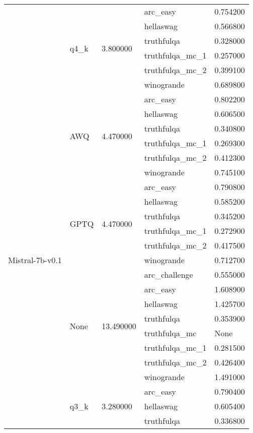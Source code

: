 \begin{tabular}{lllll}
 & \multirow[t]{6}{*}{q4\_k} & \multirow[t]{6}{*}{3.800000} & arc\_easy & 0.754200 \\
 &  &  & hellaswag & 0.566800 \\
 &  &  & truthfulqa & 0.328000 \\
 &  &  & truthfulqa\_mc\_1 & 0.257000 \\
 &  &  & truthfulqa\_mc\_2 & 0.399100 \\
 &  &  & winogrande & 0.689800 \\
\cline{1-5} \cline{2-5} \cline{3-5}
\multirow[t]{38}{*}{Mistral-7b-v0.1} & \multirow[t]{6}{*}{AWQ} & \multirow[t]{6}{*}{4.470000} & arc\_easy & 0.802200 \\
 &  &  & hellaswag & 0.606500 \\
 &  &  & truthfulqa & 0.340800 \\
 &  &  & truthfulqa\_mc\_1 & 0.269300 \\
 &  &  & truthfulqa\_mc\_2 & 0.412300 \\
 &  &  & winogrande & 0.745100 \\
\cline{2-5} \cline{3-5}
 & \multirow[t]{6}{*}{GPTQ} & \multirow[t]{6}{*}{4.470000} & arc\_easy & 0.790800 \\
 &  &  & hellaswag & 0.585200 \\
 &  &  & truthfulqa & 0.345200 \\
 &  &  & truthfulqa\_mc\_1 & 0.272900 \\
 &  &  & truthfulqa\_mc\_2 & 0.417500 \\
 &  &  & winogrande & 0.712700 \\
\cline{2-5} \cline{3-5}
 & \multirow[t]{8}{*}{None} & \multirow[t]{8}{*}{13.490000} & arc\_challenge & 0.555000 \\
 &  &  & arc\_easy & 1.608900 \\
 &  &  & hellaswag & 1.425700 \\
 &  &  & truthfulqa & 0.353900 \\
 &  &  & truthfulqa\_mc & None \\
 &  &  & truthfulqa\_mc\_1 & 0.281500 \\
 &  &  & truthfulqa\_mc\_2 & 0.426400 \\
 &  &  & winogrande & 1.491000 \\
\cline{2-5} \cline{3-5}
 & \multirow[t]{6}{*}{q3\_k} & \multirow[t]{6}{*}{3.280000} & arc\_easy & 0.790400 \\
 &  &  & hellaswag & 0.605400 \\
 &  &  & truthfulqa & 0.336800 \\

\end{tabular}
